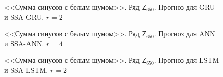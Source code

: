 \documentclass[specialist,
               substylefile = spbu.rtx,
               subf,href,colorlinks=true, 12p]{disser}
\begin{document}
\begin{figure}[H]
	\captionsetup{justification=centering}
	\caption{<<Сумма синусов с белым шумом>>. Ряд $\mathsf{Z}_{650}$. Прогноз для GRU и SSA-GRU. $r = 2$}
	\label{edsinr_r2_res_gru}
\end{figure}

\begin{figure}[H]
	\captionsetup{justification=centering}
	\caption{<<Сумма синусов с белым шумом>>. Ряд $\mathsf{Z}_{650}$. Прогноз для ANN и SSA-ANN. $r = 4$}
\end{figure}


\begin{figure}[H]
	\captionsetup{justification=centering}
	\caption{<<Сумма синусов с белым шумом>>. Ряд $\mathsf{Z}_{650}$. Прогноз для LSTM и SSA-LSTM. $r = 2$}
	\label{edsinr_r2_res_lstm}
\end{figure}
\end{document}
